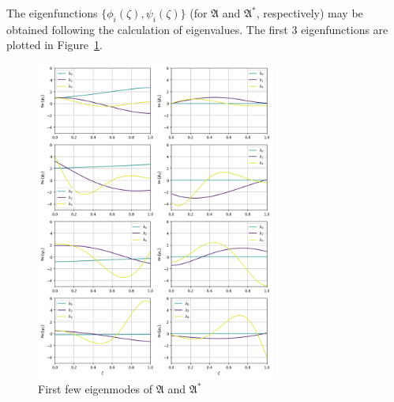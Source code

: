 The eigenfunctions $\{ \phi_i(\zeta), \psi_i(\zeta) \}$ (for $\mathfrak{A}$ and $\mathfrak{A}^*$, respectively) may be obtained following the calculation of eigenvalues. The first 3 eigenfunctions are plotted in Figure~\ref{fig:eigfun}. 

\begin{figure}[H]
    \centering
    \includegraphics[width=0.7\textwidth]{Figures/eigfuns.png}
    \caption{First few eigenmodes of $\mathfrak{A}$ and $\mathfrak{A}^*$}
    \label{fig:eigfun}
\end{figure}
